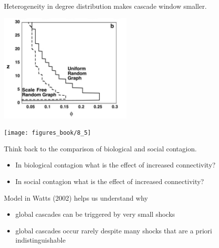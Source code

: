 \documentclass[aspectratio=169]{beamer}
\begin{document}
\begin{frame}

Heterogeneity in degree distribution makes cascade window smaller.

\begin{center}
\includegraphics[width=0.5\textwidth]{figures/watts_simple_2002_fig4b}
\end{center}

\end{frame}
\begin{frame}

\vspace{-0.6in}
\begin{center}
\texttt{[image: figures\_book/8\_5]}
\end{center}
\vspace{-0.4in}
Think back to the comparison of biological and social contagion.
\begin{itemize}
\item {}In biological contagion what is the effect of increased connectivity? 
\item {}In social contagion what is the effect of increased connectivity? 
\end{itemize}


\end{frame}
\begin{frame}

Model in Watts (2002) helps us understand why
\begin{itemize}
\item global cascades can be triggered by very small shocks
\pause
\item global cascades occur rarely despite many shocks that are a priori indistinguishable
\end{itemize}

\end{frame}
\end{document}
